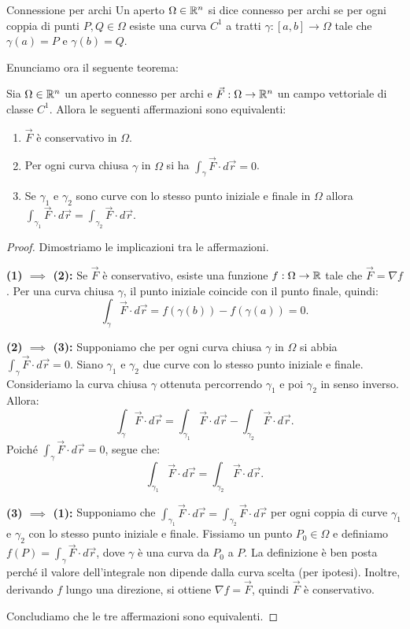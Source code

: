 \begin{definizione}{Connessione per archi}
  Un aperto $\Omega \in \mathbb{R}^n$ si dice connesso per archi se per ogni coppia di punti $P,Q \in \Omega$ esiste una curva $C^1$ a tratti $\gamma: [a,b] \rightarrow \Omega$ tale che $\gamma(a) = P$ e $\gamma(b) = Q$.
\end{definizione}

Enunciamo ora il seguente teorema:
\begin{teorema}{}
  Sia $\Omega \in \mathbb{R}^n$ un aperto connesso per archi e $\vec F: \Omega \rightarrow \mathbb{R}^n$ un campo vettoriale di classe $C^1$. Allora le seguenti affermazioni sono equivalenti:
  \begin{enumerate}
    \item $\vec F$ è conservativo in $\Omega$.
    \item Per ogni curva chiusa $\gamma$ in $\Omega$ si ha $\int_\gamma \vec F \cdot d\vec r = 0$.
    \item Se $\gamma_1$ e $\gamma_2$ sono curve con lo stesso punto iniziale e finale in $\Omega$ allora $\int_{\gamma_1} \vec F \cdot d\vec r = \int_{\gamma_2} \vec F \cdot d\vec r$.
  \end{enumerate}
\end{teorema}

\begin{proof}
  Dimostriamo le implicazioni tra le affermazioni.

  \textbf{(1) $\implies$ (2):} Se $\vec F$ è conservativo, esiste una funzione $f: \Omega \rightarrow \mathbb{R}$ tale che $\vec F = \nabla f$. Per una curva chiusa $\gamma$, il punto iniziale coincide con il punto finale, quindi:
  $$ \int_\gamma \vec F \cdot d\vec r = f(\gamma(b)) - f(\gamma(a)) = 0. $$

  \textbf{(2) $\implies$ (3):} Supponiamo che per ogni curva chiusa $\gamma$ in $\Omega$ si abbia $\int_\gamma \vec F \cdot d\vec r = 0$. Siano $\gamma_1$ e $\gamma_2$ due curve con lo stesso punto iniziale e finale. Consideriamo la curva chiusa $\gamma$ ottenuta percorrendo $\gamma_1$ e poi $\gamma_2$ in senso inverso. Allora:
  $$ \int_\gamma \vec F \cdot d\vec r = \int_{\gamma_1} \vec F \cdot d\vec r - \int_{\gamma_2} \vec F \cdot d\vec r. $$
  Poiché $\int_\gamma \vec F \cdot d\vec r = 0$, segue che:
  $$ \int_{\gamma_1} \vec F \cdot d\vec r = \int_{\gamma_2} \vec F \cdot d\vec r. $$

  \textbf{(3) $\implies$ (1):} Supponiamo che $\int_{\gamma_1} \vec F \cdot d\vec r = \int_{\gamma_2} \vec F \cdot d\vec r$ per ogni coppia di curve $\gamma_1$ e $\gamma_2$ con lo stesso punto iniziale e finale. Fissiamo un punto $P_0 \in \Omega$ e definiamo $f(P) = \int_{\gamma} \vec F \cdot d\vec r$, dove $\gamma$ è una curva da $P_0$ a $P$. La definizione è ben posta perché il valore dell'integrale non dipende dalla curva scelta (per ipotesi). Inoltre, derivando $f$ lungo una direzione, si ottiene $\nabla f = \vec F$, quindi $\vec F$ è conservativo.

  Concludiamo che le tre affermazioni sono equivalenti.
\end{proof}

